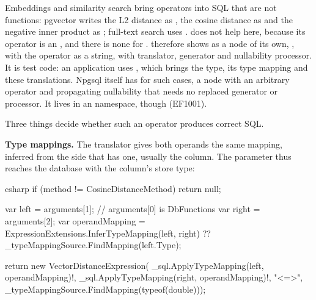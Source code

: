 Embeddings and similarity search bring operators into SQL that are not functions: pgvector
writes the L2 distance as \code{<->}, the cosine distance as
\code{<=>} and the negative inner product as
\code{<\#>}; full-text search uses .
 does not help here, because its operator
is an , and there is none for
\code{<=>}. 
therefore shows
 as a node of its own, , with the
operator as a string, with translator, generator and nullability processor. It is test code:
an application uses ,
which brings the  type, its type mapping and these translations. Npgsql itself has
 for such cases, a node
with an arbitrary operator and propagating nullability that needs no replaced generator or
processor. It lives in an  namespace, though (EF1001).

Three things decide whether such an operator produces correct SQL.

\textbf{Type mappings.} The translator gives both operands the same mapping, inferred from the
side that has one, usually the column. The parameter thus reaches the database with the
column's store type:

\begin{sourcecode}{csharp}
if (method != CosineDistanceMethod)
    return null;

var left = arguments[1];                        // arguments[0] is DbFunctions
var right = arguments[2];
var operandMapping = ExpressionExtensions.InferTypeMapping(left, right)
                     ?? _typeMappingSource.FindMapping(left.Type);

return new VectorDistanceExpression(
    _sql.ApplyTypeMapping(left, operandMapping)!,
    _sql.ApplyTypeMapping(right, operandMapping)!,
    "<=>",
    _typeMappingSource.FindMapping(typeof(double)));
\end{sourcecode}

